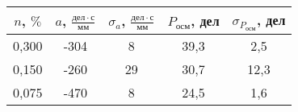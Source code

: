 \begin{tabular}[t]{|c|c|c|c|c|}
\hline
$n$, $\%$ & $a$, $\frac{дел \cdot с}{мм}$ & $\sigma_a$, $\frac{дел \cdot с}{мм}$ & $P_{осм}$, дел & $\sigma_{P_{осм}}$, дел \\ 
\hline
0,300 & -304 & 8 & 39,3 & 2,5 \\ 
0,150 & -260 & 29 & 30,7 & 12,3 \\ 
0,075 & -470 & 8 & 24,5 & 1,6 \\ 
\hline
\end{tabular}